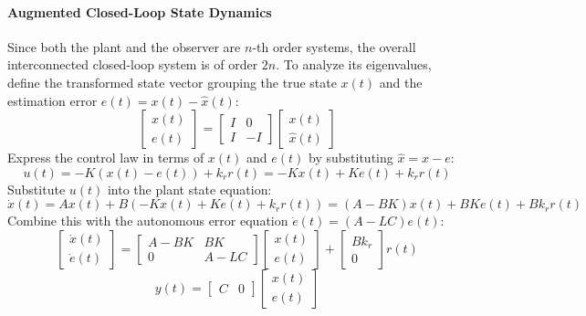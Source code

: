 \documentclass[12pt,onecolumn,twoside ]{article}
\begin{document}
	\paragraph{Augmented Closed-Loop State Dynamics}
	Since both the plant and the observer are $n$-th order systems, the overall interconnected closed-loop system is of order $2n$. To analyze its eigenvalues, define the transformed state vector grouping the true state $x(t)$ and the estimation error $e(t) = x(t) - \hat{x}(t)$: \[
	\begin{bmatrix} x(t) \\ e(t) \end{bmatrix} = \begin{bmatrix} I & 0 \\ I & -I \end{bmatrix} \begin{bmatrix} x(t) \\ \hat{x}(t) \end{bmatrix}
	\]
	Express the control law in terms of $x(t)$ and $e(t)$ by substituting $\hat{x} = x - e$: \[
	u(t) = -K(x(t) - e(t)) + k_r r(t) = -Kx(t) + Ke(t) + k_r r(t)
	\]
	Substitute $u(t)$ into the plant state equation: \[
	\dot{x}(t) = Ax(t) + B\left( -Kx(t) + Ke(t) + k_r r(t) \right) = (A - BK)x(t) + BKe(t) + B k_r r(t)
	\]
	Combine this with the autonomous error equation $\dot{e}(t) = (A - LC)e(t)$: \[
	\begin{bmatrix} \dot{x}(t) \\ \dot{e}(t) \end{bmatrix} = \begin{bmatrix} A - BK & BK \\ 0 & A - LC \end{bmatrix} \begin{bmatrix} x(t) \\ e(t) \end{bmatrix} + \begin{bmatrix} B k_r \\ 0 \end{bmatrix} r(t)
	\] \[
	y(t) = \begin{bmatrix} C & 0 \end{bmatrix} \begin{bmatrix} x(t) \\ e(t) \end{bmatrix}
	\]
\end{document}
